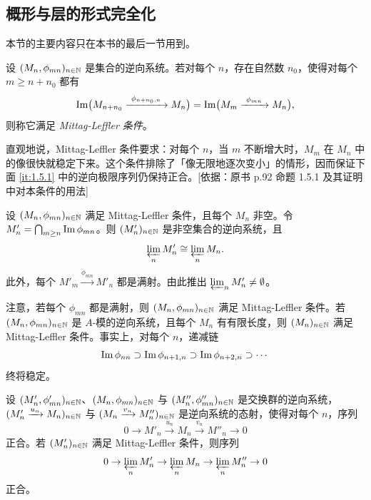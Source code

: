 \subsection{概形与层的形式完全化}
\label{sec:1.5}

本节的主要内容只在本书的最后一节用到。

设 $(M_n,\phi_{mn})_{n\in\mathbb{N}}$ 是集合的逆向系统。若对每个 $n$，存在自然数 $n_0$，使得对每个 $m\ge n+n_0$ 都有
\[
\Image\bigl(M_{n+n_0}\xrightarrow{\ \phi_{n+n_0,n}\ }M_n\bigr)
=\Image\bigl(M_m\xrightarrow{\ \phi_{mn}\ }M_n\bigr),
\]
则称它满足 \emph{Mittag-Leffler 条件}。
\begin{tnote}
直观地说，Mittag-Leffler 条件要求：对每个 $n$，当 $m$ 不断增大时，$M_m$ 在 $M_n$ 中的像很快就稳定下来。这个条件排除了「像无限地逐次变小」的情形，因而保证下面 \ref{it:1.5.1} 中的逆向极限序列仍保持正合。[依据：原书 p.92 命题 1.5.1 及其证明中对本条件的用法]
\end{tnote}

设 $(M_n,\phi_{mn})_{n\in\mathbb{N}}$ 满足 Mittag-Leffler 条件，且每个 $M_n$ 非空。令 $M'_n=\bigcap_{m\ge n}\operatorname{Im}\phi_{mn}$。则 $(M'_n)_{n\in\mathbb{N}}$ 是非空集合的逆向系统，且
\[
\varprojlim_n M'_n\cong\varprojlim_n M_n.
\]
此外，每个 $M'_m\xrightarrow{\phi_{mn}}M'_n$ 都是满射。由此推出 $\varprojlim_n M'_n\ne\emptyset$。

注意，若每个 $\phi_{mn}$ 都是满射，则 $(M_n,\phi_{mn})_{n\in\mathbb{N}}$ 满足 Mittag-Leffler 条件。若 $(M_n,\phi_{mn})_{n\in\mathbb{N}}$ 是 $A$-模的逆向系统，且每个 $M_n$ 有有限长度，则 $(M_n)_{n\in\mathbb{N}}$ 满足 Mittag-Leffler 条件。事实上，对每个 $n$，递减链
\[
\operatorname{Im}\phi_{nn}\supset\operatorname{Im}\phi_{n+1,n}\supset\operatorname{Im}\phi_{n+2,n}\supset\cdots
\]
终将稳定。

\begin{proposition}\label{it:1.5.1}
设 $(M'_n,\phi'_{mn})_{n\in\mathbb{N}}$、$(M_n,\phi_{mn})_{n\in\mathbb{N}}$ 与 $(M''_n,\phi''_{mn})_{n\in\mathbb{N}}$ 是交换群的逆向系统，$(M'_n\xrightarrow{u_n}M_n)_{n\in\mathbb{N}}$ 与 $(M_n\xrightarrow{v_n}M''_n)_{n\in\mathbb{N}}$ 是逆向系统的态射，使得对每个 $n$，序列
\[
0\to M'_n\xrightarrow{u_n}M_n\xrightarrow{v_n}M''_n\to 0
\]
正合。若 $(M'_n)_{n\in\mathbb{N}}$ 满足 Mittag-Leffler 条件，则序列
\[
0\to\varprojlim_n M'_n\to\varprojlim_n M_n\to\varprojlim_n M''_n\to 0
\]
正合。
\end{proposition}

